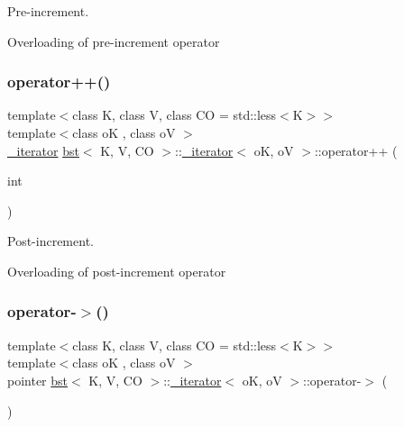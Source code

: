 Pre-\/increment. 

Overloading of pre-\/increment operator \mbox{\label{classbst_1_1__iterator_a8f721fc01d751f322216b7f67ac0a4df}} 
\subsubsection{\texorpdfstring{operator++()}{operator++()}\hspace{0.1cm}{\footnotesize\ttfamily [4/4]}}
{\footnotesize\ttfamily template$<$class K, class V, class CO = std\+::less$<$\+K$>$$>$ \\
template$<$class oK , class oV $>$ \\
\hyperlink{classbst_1_1__iterator}{\+\_\+iterator} \hyperlink{classbst}{bst}$<$ K, V, CO $>$\+::\hyperlink{classbst_1_1__iterator}{\+\_\+iterator}$<$ oK, oV $>$\+::operator++ (\begin{DoxyParamCaption}\item[{int}]{ }\end{DoxyParamCaption})\hspace{0.3cm}{\ttfamily [inline]}}



Post-\/increment. 

Overloading of post-\/increment operator \mbox{\label{classbst_1_1__iterator_ab0600ef918d7840c080a7dab0e43d8cd}} 
\subsubsection{\texorpdfstring{operator-\/$>$()}{operator->()}\hspace{0.1cm}{\footnotesize\ttfamily [1/2]}}
{\footnotesize\ttfamily template$<$class K, class V, class CO = std\+::less$<$\+K$>$$>$ \\
template$<$class oK , class oV $>$ \\
pointer \hyperlink{classbst}{bst}$<$ K, V, CO $>$\+::\hyperlink{classbst_1_1__iterator}{\+\_\+iterator}$<$ oK, oV $>$\+::operator-\/$>$ (\begin{DoxyParamCaption}{ }\end{DoxyParamCaption})\hspace{0.3cm}{\ttfamily [inline]}}



